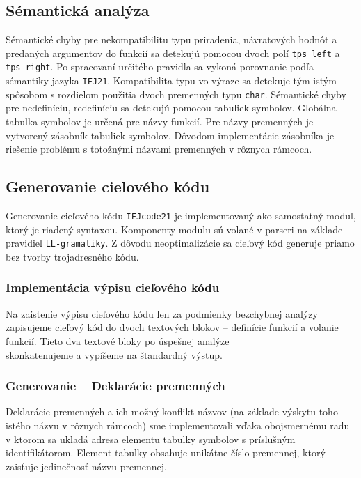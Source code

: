 \documentclass[a4paper, 11pt]{article}
\begin{document}
    \subsection{Sémantická analýza}

        Sémantické chyby pre nekompatibilitu typu priradenia, návratových hodnôt a predaných
        argumentov do funkcií sa detekujú pomocou dvoch polí \texttt{tps\_left} a \texttt{tps\_right}. Po spracovaní
        určitého pravidla sa vykoná porovnanie podľa sémantiky jazyka \texttt{IFJ21}.
        Kompatibilita typu vo výraze sa detekuje tým istým spôsobom s rozdielom použitia dvoch premenných typu \texttt{char}.
        Sémantické chyby pre nedefiníciu, redefiníciu sa detekujú pomocou tabuliek symbolov. Globálna tabulka
        symbolov je určená pre názvy funkcií. Pre názvy premenných je vytvorený zásobník
        tabuliek symbolov. Dôvodom implementácie zásobníka je riešenie problému s totožnými názvami premenných v
        rôznych rámcoch.



    \subsection{Generovanie cielového kódu}
    Generovanie cieľového kódu \texttt{IFJcode21} je implementovaný ako samostatný modul, ktorý je riadený syntaxou.
    Komponenty modulu sú volané v parseri na základe pravidiel \texttt{LL-gramatiky}. Z dôvodu neoptimalizácie sa cieľový kód
    generuje priamo bez tvorby trojadresného kódu.

    \subsubsection{Implementácia výpisu cieľového kódu}
    Na zaistenie výpisu cieľového kódu len za podmienky bezchybnej analýzy zapisujeme cieľový kód do dvoch textových
    blokov -- definície funkcií a volanie funkcií. Tieto dva textové bloky po úspešnej analýze\\ skonkatenujeme a
    vypíšeme na štandardný výstup.

    \subsubsection{Generovanie -- Deklarácie premenných}
    Deklarácie premenných a ich možný konflikt názvov (na základe výskytu toho istého názvu v rôznych rámcoch)
    sme implementovali vďaka obojsmernému radu v ktorom sa ukladá adresa elementu tabulky
    symbolov s príslušným identifikátorom. Element tabulky obsahuje unikátne číslo premennej, ktorý zaisťuje jedinečnosť
    názvu premennej.
\end{document}
